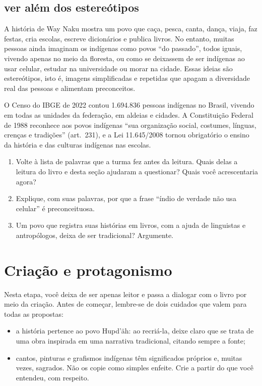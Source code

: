\section{ver além dos estereótipos}

A história de Way Naku mostra um povo que caça, pesca, canta, dança,
viaja, faz festas, cria escolas, escreve dicionários e publica livros. No
entanto, muitas pessoas ainda imaginam os indígenas como povos ``do
passado'', todos iguais, vivendo apenas no meio da floresta, ou como se
deixassem de ser indígenas ao usar celular, estudar na universidade ou
morar na cidade. Essas ideias são estereótipos, isto é, imagens
simplificadas e repetidas que apagam a diversidade real das pessoas e
alimentam preconceitos.

O Censo do IBGE de 2022 contou 1.694.836 pessoas indígenas no Brasil,
vivendo em todas as unidades da federação, em aldeias e cidades. A
Constituição Federal de 1988 reconhece aos povos indígenas ``sua
organização social, costumes, línguas, crenças e tradições'' (art.~231),
e a Lei 11.645/2008 tornou obrigatório o ensino da história e das
culturas indígenas nas escolas.

\begin{enumerate}[label=\arabic*.,resume]
\item Volte à lista de palavras que a turma fez antes da leitura. Quais
delas a leitura do livro e desta seção ajudaram a questionar? Quais você
acrescentaria agora?
\item Explique, com suas palavras, por que a frase ``índio de verdade
não usa celular'' é preconceituosa.
\item Um povo que registra suas histórias em livros, com a ajuda de
linguistas e antropólogos, deixa de ser tradicional? Argumente.
\end{enumerate}

\chapter{Criação e protagonismo}

Nesta etapa, você deixa de ser apenas leitor e passa a dialogar com o
livro por meio da criação. Antes de começar, lembre-se de dois cuidados
que valem para todas as propostas:

\begin{itemize}
\item a história pertence ao povo Hupd'äh: ao recriá-la, deixe claro que
se trata de uma obra inspirada em uma narrativa tradicional, citando
sempre a fonte;
\item cantos, pinturas e grafismos indígenas têm significados próprios e,
muitas vezes, sagrados. Não os copie como simples enfeite. Crie a partir
do que você entendeu, com respeito.
\end{itemize}

